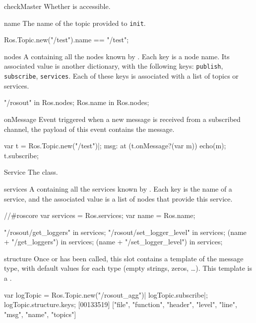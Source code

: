 \begin{urbiscriptapi}
\item[checkMaster]
  Whether  is accessible.


\item[name]%
  The name of the topic provided to \lstinline{init}.
\begin{urbiassert}
Ros.Topic.new("/test").name == "/test";
\end{urbiassert}


\item[nodes]%
  A  containing all the nodes known by
  . Each key is a node name. Its associated value is
  another dictionary, with the following keys: \lstinline{publish},
  \lstinline{subscribe}, \lstinline{services}.  Each of these keys is
  associated with a list of topics or services.
\begin{urbiassert}
"/rosout" in Ros.nodes;
Ros.name in Ros.nodes;
\end{urbiassert}


\item[onMessage]%
  Event triggered when a new message is received from a subscribed channel,
  the payload of this event contains the message.

\begin{urbiunchecked}
var t = Ros.Topic.new("/test")|;
msg: at (t.onMessage?(var m)) echo(m);
t.subscribe;
\end{urbiunchecked}


\item[Service]%
  The  class.


\item[services]%
  A  containing all the services known by
  . Each key is the name of a service, and the associated
  value is a list of nodes that provide this service.
\begin{urbiassert}
//#roscore
var services = Ros.services;
var name = Ros.name;

       "/rosout/get_loggers" in services;
  "/rosout/set_logger_level" in services;
     (name + "/get_loggers") in services;
(name + "/set_logger_level") in services;
\end{urbiassert}


\item[structure]%
  Once  or  has been called, this slot
  contains a template of the message type, with default values for each type
  (empty strings, zeros, \ldots).  This template is a
  .
\begin{urbiscript}
var logTopic = Ros.Topic.new("/rosout_agg")|
logTopic.subscribe|;
logTopic.structure.keys;
[00133519] ["file", "function", "header", "level", "line", "msg", "name", "topics"]
\end{urbiscript}



\end{urbiscriptapi}
